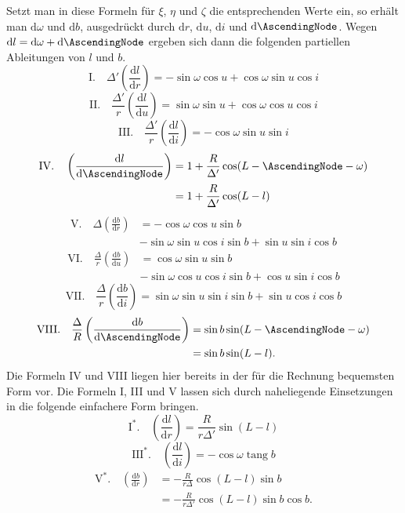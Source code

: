 Setzt man in diese Formeln für $\xi$, $\eta$ und $\zeta$ die entsprechenden Werte ein, so erhält man $\mathrm{d}\omega$ und $\mathrm{d}b$, ausgedrückt durch $\mathrm{d}r$, $\mathrm{d}u$, $\mathrm{d}i$ und $\mathrm{d}\AscendingNode$. Wegen $\mathrm{d}l=\mathrm{d}\omega+\mathrm{d}\AscendingNode$ ergeben sich dann die folgenden partiellen Ableitungen von $l$ und $b$.
\[
\mathrm{I.}\quad \Delta'\left(\frac{\mathrm{d}l}{\mathrm{d}r}\right) = -\sin\omega\cos u + \cos\omega\sin u\cos i
\]
\[
\mathrm{II.}\quad \frac{\Delta'}{r}\left(\frac{\mathrm{d}l}{\mathrm{d}u}\right) = \sin\omega\sin u + \cos\omega\cos u\cos i
\]
\[
\mathrm{III.}\quad \frac{\Delta'}{r}\left(\frac{\mathrm{d}l}{\mathrm{d}i}\right) = -\cos\omega\sin u\sin i
\]
\[
\begin{aligned}
\mathrm{IV.}\quad \left(\frac{\mathrm{d}l}{\mathrm{d}\AscendingNode}\right) &= 1+\frac{R}{\Delta'}\cos(L-\AscendingNode-\omega)\\
& = 1+\frac{R}{\Delta'}\cos(L-l)
\end{aligned}
\]
\[
\begin{aligned}
\mathrm{V.}\quad \Delta\left(\frac{\mathrm{d}b}{\mathrm{d}r}\right) &= -\cos\omega\cos u\sin b\\
& - \sin\omega\sin u\cos i\sin b + \sin u\sin i\cos b
\end{aligned}
\]
\[
\begin{aligned}
\mathrm{VI.}\quad \frac{\Delta}{r}\left(\frac{\mathrm{d}b}{\mathrm{d}u}\right) &= \cos\omega\sin u\sin b\\
& - \sin\omega\cos u\cos i\sin b + \cos u\sin i\cos b
\end{aligned}
\]
\[
\mathrm{VII.}\quad \frac{\Delta}{r}\left(\frac{\mathrm{d}b}{\mathrm{d}i}\right) = \sin\omega\sin u\sin i\sin b + \sin u\cos i\cos b
\]
\[
\begin{aligned}
\mathrm{VIII.}\quad \frac{\Delta}{R}\left(\frac{\mathrm{d}b}{\mathrm{d}\AscendingNode}\right) &= \sin b\sin(L-\AscendingNode-\omega)\\
& = \sin b\sin(L-l).
\end{aligned}
\]
\noindent Die Formeln IV und VIII liegen hier bereits in der für die Rechnung bequemsten Form vor. Die Formeln I, III und V lassen sich durch naheliegende Einsetzungen in die folgende einfachere Form bringen.
\[
\mathrm{I}^{*}.\quad \left(\frac{\mathrm{d}l}{\mathrm{d}r}\right) = \frac{R}{r\Delta'}\sin(L-l)
\]
\[
\mathrm{III}^{*}.\quad \left(\frac{\mathrm{d}l}{\mathrm{d}i}\right) = -\cos\omega\operatorname{tang}b
\]
\[
\begin{aligned}
\mathrm{V}^{*}.\quad \left(\frac{\mathrm{d}b}{\mathrm{d}r}\right) &= -\frac{R}{r\Delta}\cos(L-l)\sin b\\
& = -\frac{R}{r\Delta'}\cos(L-l)\sin b\cos b.
\end{aligned}
\]

